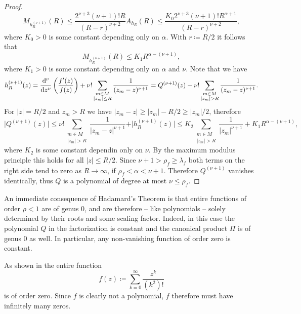 \begin{proof}
    $$ M_{h_R^{(\nu + 1)}}(R) \leq \frac{2^{\nu + 3} (\nu + 1)! R}{(R - r)^{\nu + 2}} A_{h_R}(R) \leq \frac{K_0 2^{\nu + 3} (\nu + 1)! R^{\alpha + 1}}{(R - r)^{\nu + 2}}, $$
    where $K_0 > 0$ is some constant depending only on $\alpha$. With $r \coloneqq R / 2$ it follows that
    $$ M_{h_R^{(\nu + 1)}}(R) \leq K_1 R^{\alpha - (\nu + 1)}, $$
    where $K_1 > 0$ is some constant depending only on $\alpha$ and $\nu$. Note that we have
    $$ h_R^{(\nu + 1)}(z) = \frac{\mathrm{d}^{\nu}}{\mathrm{d} {z}^{\nu}} \left( \frac{f'(z)}{f(z)} \right) + \nu! \sum_{\substack{m \in M \\ \vert z_m \vert \leq R}} \frac{1}{(z_m - z)^{\nu + 1}} = Q^{(\nu + 1)}(z) - \nu! \sum_{\substack{m \in M \\ \vert z_m \vert > R}} \frac{1}{(z_m - z)^{\nu + 1}}. $$
    For $\vert z \vert = R / 2$ and $z_m > R$ we have $\vert z_m - z \vert \geq \vert z_m \vert - R / 2 \geq \vert z_m \vert / 2$, therefore
    $$ \vert Q^{(\nu+1)}(z) \vert \leq \nu! \sum_{\substack{m \in M \\ \vert z_m \vert > R}} \frac{1}{\vert z_m - z \vert^{\nu + 1}} + \vert h_R^{(\nu + 1)}(z) \vert \leq K_2 \sum_{\substack{m \in M \\ \vert z_m \vert > R}} \frac{1}{\vert z_m \vert^{\nu + 1}} + K_1 R^{\alpha - (\nu + 1)}, $$
    where $K_2$ is some constant dependin only on $\nu$. By the maximum modulus principle this holds for all $\vert z \vert \leq R / 2$. Since $\nu + 1 > \rho_f \geq \lambda_f$ both terms on the right side tend to zero as $R \to \infty$, if $\rho_f < \alpha < \nu + 1$. Therefore $Q^{(\nu + 1)}$ vanishes identically, thus $Q$ is a polynomial of degree at most $\nu \leq \rho_f$.
\end{proof}

\begin{remark} \label{rem:consequences-hadamard}
    An immediate consequence of Hadamard's Theorem is that entire functions of order $\rho < 1$ are of genus $0$, and are therefore -- like polynomials -- solely determined by their roots and some scaling factor. Indeed, in this case the polynomial $Q$ in the factorization is constant and the canonical product $\Pi$ is of genus $0$ as well. In particular, any non-vanishing function of order zero is constant.

    As shown in  the entire function
    $$ f(z) \coloneqq \sum_{k=0}^\infty \frac{z^k}{(k^2)!} $$
    is of order zero. Since $f$ is clearly not a polynomial, $f$ therefore must have infinitely many zeros.
\end{remark}

